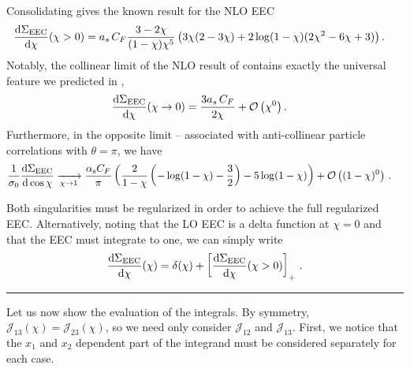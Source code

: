 Consolidating gives the known result for the NLO EEC \cite{Basham:1978bw}
\begin{align}
    \label{eq:ee_to_hadrons_eec_nlo}
    \frac{\dd\Sigma_\text{EEC}}{\dd\chi}(\chi>0)
    &=
    \ascf
    \frac{3-2\chi}{(1-\chi)\chi^5}
    \le(
        3 \chi (2 - 3 \chi)
        +
        2 \log(1 - \chi) (2 \chi^2 - 6 \chi + 3)
    \ri)
    .
\end{align}
%
Notably, the collinear limit of the NLO result of  contains exactly the universal feature we predicted in ,
\begin{align}
    \frac{\dd\Sigma_\text{EEC}}{\dd\chi}(\chi\to 0)
    &=
    \frac{3a_s \, C_F}{2\chi}
    +
    \mathcal O\left(\chi^0\right)
    .
\end{align}
%
Furthermore, in the opposite limit -- associated with anti-collinear particle correlations with \(\theta = \pi\), we have
\begin{align}
    \frac{1}{\sigma_0}
    \dv{\Sigma_\text{EEC}}{\cos\chi}{}
    &\xrightarrow[\chi\to 1]{}
    \frac{\alpha_{\mathrm{s}} C_F}{\pi}
    \left(
        \frac{2}{1-\chi}
        \left(
            -\log(1-\chi)
            -\frac{3}{2}
        \right)
        - 5 \log(1-\chi)
    \right)
    + \mathcal O\left((1-\chi)^0\right)
    \,.
\end{align}

Both singularities must be regularized in order to achieve the full regularized EEC.
%
Alternatively, noting that the LO EEC is a delta function at \(\chi = 0\) and that the EEC must integrate to one, we can simply write
\begin{align}
    \frac{\dd \Sigma_\text{EEC}}{\dd \chi}(\chi)
    =
    \delta(\chi)
    +
    \left[
    \frac{\dd \Sigma_\text{EEC}}{\dd \chi}(\chi > 0)
    \right]_+
    \,.
\end{align}




\vspace{12pt}
\hrule
\vspace{12pt}

Let us now show the evaluation of the integrals.
%
By symmetry, \(\mathcal{J}_{13}(\chi) = \mathcal{J}_{23}(\chi)\), so we need only consider \(\mathcal{J}_{12}\) and \(\mathcal{J}_{13}\).
%
First, we notice that the \(x_1\) and \(x_2\) dependent part of the integrand must be considered separately for each case.

